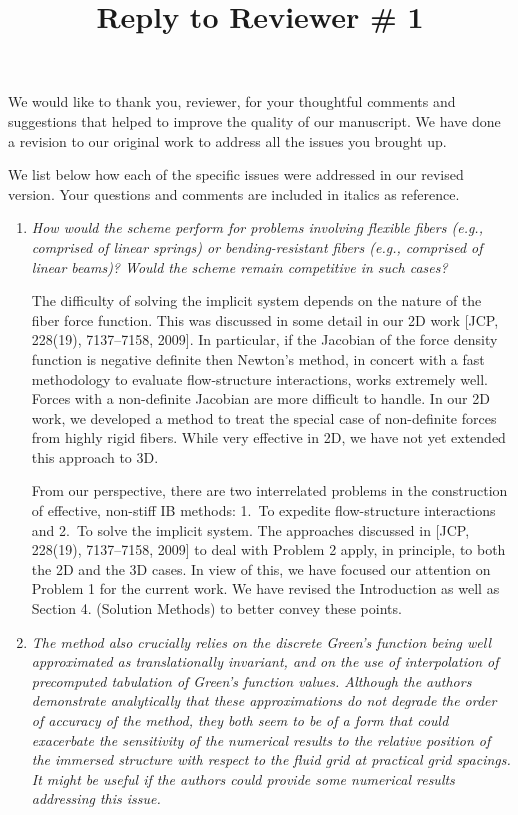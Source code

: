 \documentclass[12pt]{article}
\title{Reply to Reviewer \# 1}
\author{}
\begin{document}
\maketitle
We would like to thank you,  reviewer,  for your thoughtful  comments and suggestions that helped to improve  the quality of our manuscript. 
We have done a revision to our original work to address all the issues you brought up.


We list below how each of the specific issues were addressed in our revised version. Your questions and comments are included in italics as reference.



\begin{enumerate}
\item {\em How would the scheme perform for problems involving flexible fibers
(e.g., comprised of linear springs) or bending-resistant fibers (e.g.,
comprised of linear beams)?  Would the scheme remain competitive in such
cases?}

The difficulty of solving the implicit system depends on
the nature of the fiber force function. This was discussed in some detail in our 2D work [JCP, 228(19), 7137--7158, 2009]. In particular, 
if the Jacobian of the force density function is negative definite then  Newton's method, in concert with a fast methodology to evaluate
flow-structure interactions, works extremely well. 
Forces with a non-definite Jacobian are more difficult to handle. In our 2D work,  we developed a method to treat
the special case of non-definite forces from highly rigid fibers. While very effective in 2D, we have not yet
 extended this approach to 3D. 
 
 From our perspective, there are two interrelated problems in the construction of effective, non-stiff IB methods: 1.~To expedite flow-structure interactions and 2.~To solve the implicit system. The approaches discussed in  [JCP, 228(19), 7137--7158, 2009] to deal with Problem 2 apply, in principle, to both the 2D and the 3D cases. In view of this, 
 we have focused our attention on Problem 1 for the current work.  We have revised the Introduction as well as  Section 4. (Solution Methods) to better convey these points. 


\item {\em The method also crucially relies on the discrete Green's function
being well approximated as translationally invariant, and on the use of
interpolation of precomputed tabulation of Green's function values.
Although the authors demonstrate analytically that these approximations do
not degrade the order of accuracy of the method, they both seem to be of a
form that could exacerbate the sensitivity of the numerical results to the
relative position of the immersed structure with respect to the fluid grid
at practical grid spacings. It might be useful if the authors could
provide some numerical results addressing this issue.}


\end{enumerate}
\end{document}
